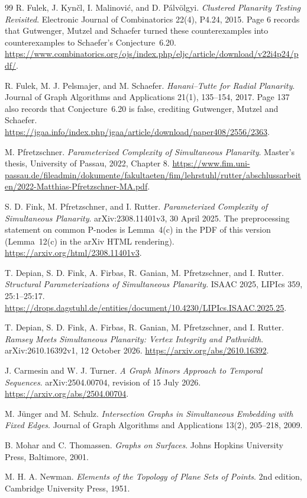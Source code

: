 \begin{thebibliography}{99}
R. Fulek, J. Kyn\v{c}l, I. Malinovi\'{c}, and D. P\'{a}lv\"olgyi.
\emph{Clustered Planarity Testing Revisited}.
Electronic Journal of Combinatorics 22(4), P4.24, 2015.
Page 6 records that Gutwenger, Mutzel and Schaefer turned these
counterexamples into counterexamples to Schaefer's Conjecture~6.20.
\url{https://www.combinatorics.org/ojs/index.php/eljc/article/download/v22i4p24/pdf/}.

R. Fulek, M. J. Pelsmajer, and M. Schaefer.
\emph{Hanani--Tutte for Radial Planarity}.
Journal of Graph Algorithms and Applications 21(1), 135--154, 2017.
Page 137 also records that Conjecture~6.20 is false, crediting
Gutwenger, Mutzel and Schaefer.
\url{https://jgaa.info/index.php/jgaa/article/download/paper408/2556/2363}.

M. Pfretzschner.
\emph{Parameterized Complexity of Simultaneous Planarity}.
Master's thesis, University of Passau, 2022, Chapter 8.
\url{https://www.fim.uni-passau.de/fileadmin/dokumente/fakultaeten/fim/lehrstuhl/rutter/abschlussarbeiten/2022-Matthias-Pfretzschner-MA.pdf}.

S. D. Fink, M. Pfretzschner, and I. Rutter.
\emph{Parameterized Complexity of Simultaneous Planarity}.
arXiv:2308.11401v3, 30 April 2025. The preprocessing statement on common
P-nodes is Lemma~4(c) in the PDF of this version (Lemma~12(c) in the
arXiv HTML rendering).
\url{https://arxiv.org/html/2308.11401v3}.

T. Depian, S. D. Fink, A. Firbas, R. Ganian, M. Pfretzschner, and I. Rutter.
\emph{Structural Parameterizations of Simultaneous Planarity}.
ISAAC 2025, LIPIcs 359, 25:1--25:17.
\url{https://drops.dagstuhl.de/entities/document/10.4230/LIPIcs.ISAAC.2025.25}.

T. Depian, S. D. Fink, A. Firbas, R. Ganian, M. Pfretzschner, and I. Rutter.
\emph{Ramsey Meets Simultaneous Planarity: Vertex Integrity and Pathwidth}.
arXiv:2610.16392v1, 12 October 2026.
\url{https://arxiv.org/abs/2610.16392}.

J. Carmesin and W. J. Turner.
\emph{A Graph Minors Approach to Temporal Sequences}.
arXiv:2504.00704, revision of 15 July 2026.
\url{https://arxiv.org/abs/2504.00704}.

M. J\"unger and M. Schulz.
\emph{Intersection Graphs in Simultaneous Embedding with Fixed Edges}.
Journal of Graph Algorithms and Applications 13(2), 205--218, 2009.

B. Mohar and C. Thomassen.
\emph{Graphs on Surfaces}.
Johns Hopkins University Press, Baltimore, 2001.

M. H. A. Newman.
\emph{Elements of the Topology of Plane Sets of Points}.
2nd edition, Cambridge University Press, 1951.
\end{thebibliography}
